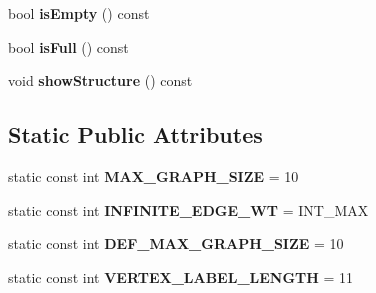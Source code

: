 \begin{DoxyCompactItemize}
\item 
\hypertarget{class_weighted_graph_a1c03a0f68447cf88fed97c2076501702}{bool {\bfseries is\+Empty} () const }\label{class_weighted_graph_a1c03a0f68447cf88fed97c2076501702}

\item 
\hypertarget{class_weighted_graph_a22e56836e3967031a657cfa9ea5b9843}{bool {\bfseries is\+Full} () const }\label{class_weighted_graph_a22e56836e3967031a657cfa9ea5b9843}

\item 
\hypertarget{class_weighted_graph_ad7f20a989073ea5401d504d944182347}{void {\bfseries show\+Structure} () const }\label{class_weighted_graph_ad7f20a989073ea5401d504d944182347}

\end{DoxyCompactItemize}
\subsection*{Static Public Attributes}
\begin{DoxyCompactItemize}
\item 
\hypertarget{class_weighted_graph_af9b34017e5b494cd3aca2dbc8335fc3c}{static const int {\bfseries M\+A\+X\+\_\+\+G\+R\+A\+P\+H\+\_\+\+S\+I\+Z\+E} = 10}\label{class_weighted_graph_af9b34017e5b494cd3aca2dbc8335fc3c}

\item 
\hypertarget{class_weighted_graph_a5d4e3055fcccb2f50667bcd588dd8af7}{static const int {\bfseries I\+N\+F\+I\+N\+I\+T\+E\+\_\+\+E\+D\+G\+E\+\_\+\+W\+T} = I\+N\+T\+\_\+\+M\+A\+X}\label{class_weighted_graph_a5d4e3055fcccb2f50667bcd588dd8af7}

\item 
\hypertarget{class_weighted_graph_ab8b56b138f61133fe3833f96c318568e}{static const int {\bfseries D\+E\+F\+\_\+\+M\+A\+X\+\_\+\+G\+R\+A\+P\+H\+\_\+\+S\+I\+Z\+E} = 10}\label{class_weighted_graph_ab8b56b138f61133fe3833f96c318568e}

\item 
\hypertarget{class_weighted_graph_a19411776f4ee4e2a68bf2bc5e03aa10b}{static const int {\bfseries V\+E\+R\+T\+E\+X\+\_\+\+L\+A\+B\+E\+L\+\_\+\+L\+E\+N\+G\+T\+H} = 11}\label{class_weighted_graph_a19411776f4ee4e2a68bf2bc5e03aa10b}

\end{DoxyCompactItemize}
